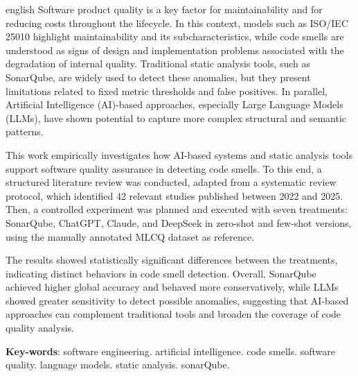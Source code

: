 \begin{resumo}[Abstract]
 \begin{otherlanguage*}{english}
   Software product quality is a key factor for maintainability and for reducing costs 
   throughout the lifecycle. In this context, models such as ISO/IEC 25010 highlight 
   maintainability and its subcharacteristics, while code smells are understood as signs 
   of design and implementation problems associated with the degradation of internal 
   quality. Traditional static analysis tools, such as SonarQube, are widely used to detect 
   these anomalies, but they present limitations related to fixed metric thresholds and 
   false positives. In parallel, Artificial Intelligence (AI)-based approaches, especially 
   Large Language Models (LLMs), have shown potential to capture more complex structural 
   and semantic patterns.

   This work empirically investigates how AI-based systems and static analysis tools support 
   software quality assurance in detecting code smells. To this end, a structured literature 
   review was conducted, adapted from a systematic review protocol, which identified 42 
   relevant studies published between 2022 and 2025. Then, a controlled experiment was 
   planned and executed with seven treatments: SonarQube, ChatGPT, Claude, and DeepSeek in 
   zero-shot and few-shot versions, using the manually annotated MLCQ dataset as reference.

   The results showed statistically significant differences between the treatments, indicating 
   distinct behaviors in code smell detection. Overall, SonarQube achieved higher global 
   accuracy and behaved more conservatively, while LLMs showed greater sensitivity to detect 
   possible anomalies, suggesting that AI-based approaches can complement traditional tools 
   and broaden the coverage of code quality analysis.

   \vspace{\onelineskip}
 
   \noindent 
   \textbf{Key-words}: software engineering. artificial intelligence. code smells. software quality. language models. static analysis. sonarQube.
 \end{otherlanguage*}
\end{resumo}
